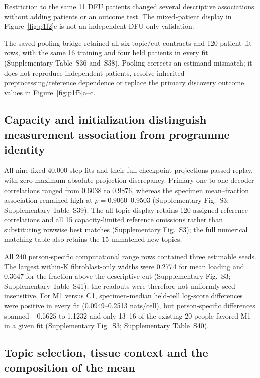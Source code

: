\documentclass[10pt,a4paper]{article}
\begin{document}
Restriction to the same 11 DFU patients changed several descriptive associations without adding patients or an outcome test. The mixed-patient display in Figure~\ref{fig:p1f2}e is not an independent DFU-only validation.

The saved pooling bridge retained all six topic/cut contracts and 120 patient--fit rows, with the same 16 training and four held patients in every fit (Supplementary Table~S36 and~S38). Pooling corrects an estimand mismatch; it does not reproduce independent patients, resolve inherited preprocessing/reference dependence or replace the primary discovery outcome values in Figure~\ref{fig:p1f5}a--c.

\subsection{Capacity and initialization distinguish measurement association from programme identity}

All nine fixed 40,000-step fits and their full checkpoint projections passed replay, with zero maximum absolute projection discrepancy. Primary one-to-one decoder correlations ranged from 0.6038 to 0.9876, whereas the specimen mean--fraction association remained high at $\rho=0.9060$--0.9503 (Supplementary Fig.~S3\label{call:p1f10}; Supplementary Table~S39). The all-topic display retains 120 assigned reference correlations and all 15 capacity-limited reference omissions rather than substituting rowwise best matches (Supplementary Fig.~S3); the full numerical matching table also retains the 15 unmatched new topics.



All 240 person-specific computational range rows contained three estimable seeds. The largest within-K fibroblast-only widths were 0.2774 for mean loading and 0.3647 for the fraction above the descriptive cut (Supplementary Fig.~S3; Supplementary Table~S41); the readouts were therefore not uniformly seed-insensitive. For M1 versus C1, specimen-median held-cell log-score differences were positive in every fit (0.0949--0.2513 nats/cell), but person-specific differences spanned $-0.5625$ to 1.1232 and only 13--16 of the existing 20 people favored M1 in a given fit (Supplementary Fig.~S3; Supplementary Table~S40).

\subsection{Topic selection, tissue context and the composition of the mean}
\end{document}
